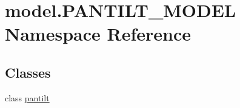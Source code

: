 \hypertarget{namespacemodel_1_1PANTILT__MODEL}{}\section{model.\+P\+A\+N\+T\+I\+L\+T\+\_\+\+M\+O\+D\+E\+L Namespace Reference}
\label{namespacemodel_1_1PANTILT__MODEL}
\subsection*{Classes}
\begin{DoxyCompactItemize}
\item 
class \hyperlink{classmodel_1_1PANTILT__MODEL_1_1pantilt}{pantilt}
\end{DoxyCompactItemize}
